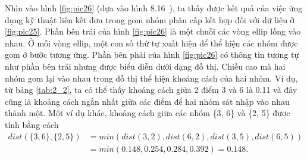 Nhìn vào hình \ref{fig:pic26} (dựa vào hình 8.16~\cite{Vipin-Kumar}), ta thấy được kết quả của việc ứng dụng kỹ thuật liên kết đơn trong gom nhóm phân cấp kết hợp đối với dữ liệu ở \ref{fig:pic25}.
Phần bên trái của hình \ref{fig:pic26} là một chuỗi các vòng ellip lồng vào nhau.
Ở mỗi vòng ellip, một con số thứ tự xuất hiện để thể hiện các nhóm được gom ở bước tương ứng.
Phần bên phải của hình \ref{fig:pic26} có thông tin tương tự như phần bên trái nhưng được biểu diễn dưới dạng đồ thị.
Chiều cao mà hai nhóm gom lại vào nhau trong đồ thị thể hiện khoảng cách của hai nhóm.
Ví dụ, từ bảng \ref{tab:2_2}, ta có thể thấy khoảng cách giữa 2 điểm 3 và 6 là 0.11 và đây cũng là khoảng cách ngắn nhất giữa các điểm để hai nhóm sát nhập vào nhau thành một. 
Một ví dụ khác, khoảng cách giữa các nhóm \{3, 6\} và \{2, 5\} được tính  bằng cách
\begin{equation}
\begin{aligned}
dist(\{3, 6\}, \{2, 5\})
&= min(dist(3,2),dist(6, 2), dist(3, 5), dist(6, 5)) \\
&= min (0.148, 0.254, 0.284, 0.392) = 0.148. \\
\end{aligned}
\end{equation}



